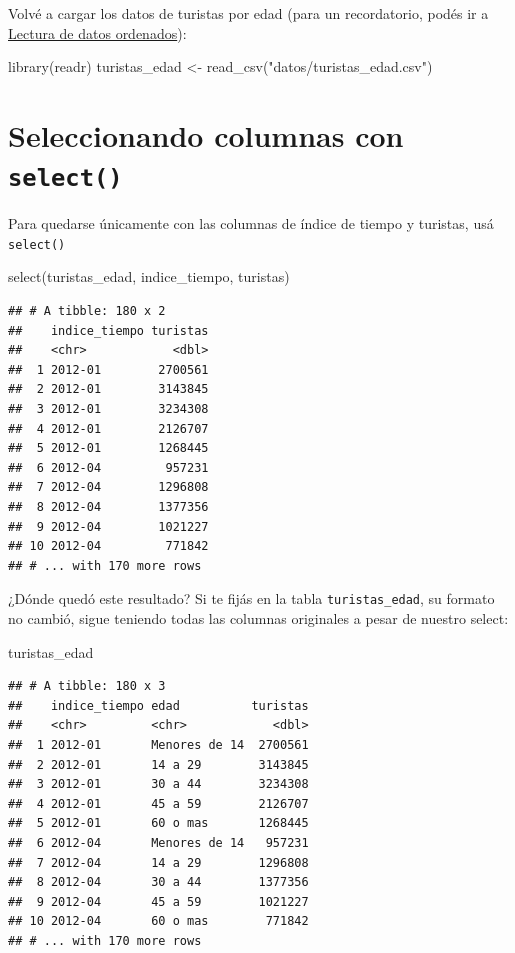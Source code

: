 \documentclass[
  openany]{book}
\newenvironment{Shaded}{\begin{snugshade}}{\end{snugshade}}
\newcommand{\FunctionTok}[1]{\textcolor[rgb]{0.00,0.00,0.00}{#1}}
\newcommand{\NormalTok}[1]{#1}
\newcommand{\OtherTok}[1]{\textcolor[rgb]{0.56,0.35,0.01}{#1}}
\newcommand{\StringTok}[1]{\textcolor[rgb]{0.31,0.60,0.02}{#1}}
\begin{document}
Volvé a cargar los datos de turistas por edad (para un recordatorio, podés ir a \href{lectura-de-datos-ordenados.html}{Lectura de datos ordenados}):

\begin{Shaded}
\begin{Highlighting}[]
\FunctionTok{library}\NormalTok{(readr)}
\NormalTok{turistas\_edad }\OtherTok{\textless{}{-}} \FunctionTok{read\_csv}\NormalTok{(}\StringTok{"datos/turistas\_edad.csv"}\NormalTok{)}
\end{Highlighting}
\end{Shaded}

\hypertarget{seleccionando-columnas-con-select}{%
\section{\texorpdfstring{Seleccionando columnas con \texttt{select()}}{Seleccionando columnas con select()}}\label{seleccionando-columnas-con-select}}

Para quedarse únicamente con las columnas de índice de tiempo y turistas, usá \texttt{select()}

\begin{Shaded}
\begin{Highlighting}[]
\FunctionTok{select}\NormalTok{(turistas\_edad, indice\_tiempo, turistas)}
\end{Highlighting}
\end{Shaded}

\begin{verbatim}
## # A tibble: 180 x 2
##    indice_tiempo turistas
##    <chr>            <dbl>
##  1 2012-01        2700561
##  2 2012-01        3143845
##  3 2012-01        3234308
##  4 2012-01        2126707
##  5 2012-01        1268445
##  6 2012-04         957231
##  7 2012-04        1296808
##  8 2012-04        1377356
##  9 2012-04        1021227
## 10 2012-04         771842
## # ... with 170 more rows
\end{verbatim}

¿Dónde quedó este resultado?
Si te fijás en la tabla \texttt{turistas\_edad}, su formato no cambió, sigue teniendo todas las columnas originales a pesar de nuestro select:

\begin{Shaded}
\begin{Highlighting}[]
\NormalTok{turistas\_edad}
\end{Highlighting}
\end{Shaded}

\begin{verbatim}
## # A tibble: 180 x 3
##    indice_tiempo edad          turistas
##    <chr>         <chr>            <dbl>
##  1 2012-01       Menores de 14  2700561
##  2 2012-01       14 a 29        3143845
##  3 2012-01       30 a 44        3234308
##  4 2012-01       45 a 59        2126707
##  5 2012-01       60 o mas       1268445
##  6 2012-04       Menores de 14   957231
##  7 2012-04       14 a 29        1296808
##  8 2012-04       30 a 44        1377356
##  9 2012-04       45 a 59        1021227
## 10 2012-04       60 o mas        771842
## # ... with 170 more rows
\end{verbatim}
\end{document}
